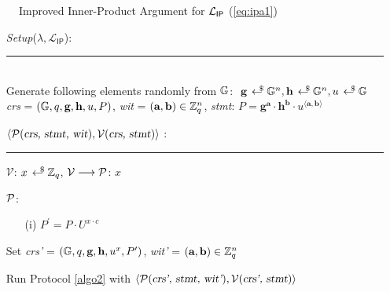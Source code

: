 \begin{figure}[h!]
    \caption{Improved Inner-Product Argument for $\L_{\textsf{IP}}$ (\ref{eq:ipa1}) }
    \label{algo3}
\end{figure}
\begin{mdframed}
    \begin{itemize}[itemsep=4pt]
        \item[] \textsl{Setup}($\lambda, \mathcal{L}_{\textsf{IP}}$):
        \\[-5pt]\rule{\textwidth}{0.4pt}\\ 
        Generate following elements randomly from $\G$: $\ \textbf{g} \rgen \G^{n}, \textbf{h} \rgen \G^n, u \rgen \G$
        \\[2pt]
        \textsl{crs} = $(\G, q, \textbf{g}, \textbf{h}, u, P)$, \textsl{wit} = $(\textbf{a}, \textbf{b}) \in \Z_q^n$, \textsl{stmt}: $P = \textbf{g}^\textbf{a} \cdot \textbf{h}^\textbf{b} \cdot u^{\langle \textbf{a},\textbf{b} \rangle}$
        \vspace{2pt}
    
        \item[] $\langle \mathcal{P}(\textsl{crs, stmt, wit}), \mathcal{V}(\textsl{crs, stmt}) \rangle$ :
        \\[-5pt]\rule{\textwidth}{0.4pt}

        \vspace{-4pt}
        \item[] $\mathcal{V}$: $x \rgen \Z_q$, $\mathcal{V} \longrightarrow \P$: $x$
    
        \vspace{-4pt}
        \item[] $\P$: \vspace{-4pt}
        \begin{enumerate}[itemsep=5pt]
            \item[(i)] $P^{\prime} = P \cdot U^{x \cdot c}$ 
        \end{enumerate}

        \item[] Set \textsl{crs'} = $(\G, q, \textbf{g}, \textbf{h}, u^x, P^{\prime})$, \textsl{wit'} = $(\textbf{a}, \textbf{b}) \in \Z_q^n$
      
        \item[] Run Protocol \ref{algo2} with $\langle \mathcal{P}(\textsl{crs', stmt, wit'}), \mathcal{V}(\textsl{crs', stmt}) \rangle$
      
    \end{itemize}
\end{mdframed}
\vspace{1cm}

